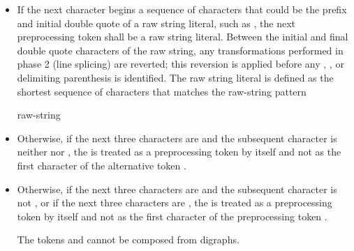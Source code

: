 \begin{itemize}
\item
{}%
If the next character begins a sequence of characters that could be the prefix
and initial double quote of a raw string literal, such as , the next preprocessing
token shall be a raw string literal. Between the initial and final
double quote characters of the raw string, any transformations performed in phase
2 (line splicing) are reverted; this reversion
is applied before any , , or delimiting
parenthesis is identified. The raw string literal is defined as the shortest sequence
of characters that matches the raw-string pattern
\begin{ncbnf}
  raw-string
\end{ncbnf}

\item Otherwise, if the next three characters are \tcode{<::} and the subsequent character
is neither \tcode{:} nor \tcode{>}, the \tcode{<} is treated as a preprocessing token by
itself and not as the first character of the alternative token \tcode{<:}.

\item
Otherwise, if the next three characters are \tcode{[::} and
the subsequent character is not \tcode{:}, or
if the next three characters are \tcode{[:>},
the \tcode{[} is treated as a preprocessing token by itself and
not as the first character of the preprocessing token \tcode{[:}.
\begin{note}
The tokens \tcode{[:} and \tcode{:]} cannot be composed from digraphs.
\end{note}


\end{itemize}
